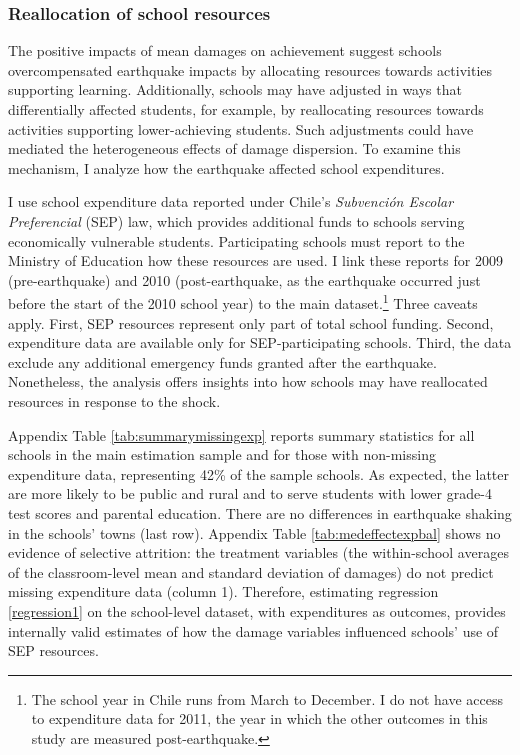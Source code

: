 \subsubsection{Reallocation of school resources}\label{sec:resources}

The positive impacts of mean damages on achievement suggest schools overcompensated earthquake impacts by allocating resources towards activities supporting learning. Additionally, schools may have adjusted in ways that differentially affected students, for example, by reallocating resources towards activities supporting lower-achieving students. Such adjustments could have mediated the heterogeneous effects of damage dispersion. To examine this mechanism, I analyze how the earthquake affected school expenditures. \par


I use school expenditure data reported under Chile’s {\itshape Subvenci\'{o}n Escolar Preferencial} (SEP) law, which provides additional funds to schools serving economically vulnerable students. Participating schools must report to the Ministry of Education how these resources are used. I link these reports for 2009 (pre-earthquake) and 2010 (post-earthquake, as the earthquake occurred just before the start of the 2010 school year) to the main dataset.\footnote{The school year in Chile runs from March to December. I do not have access to expenditure data for 2011, the year in which the other outcomes in this study are measured post-earthquake.} Three caveats apply. First, SEP resources represent only part of total school funding. Second, expenditure data are available only for SEP-participating schools. Third, the data exclude any additional emergency funds granted after the earthquake. Nonetheless, the analysis offers insights into how schools may have reallocated resources in response to the shock. \par

Appendix Table \ref{tab:summarymissingexp} reports summary statistics for all schools in the main estimation sample and for those with non-missing expenditure data, representing 42\% of the sample schools. As expected, the latter are more likely to be public and rural and to serve students with lower grade-4 test scores and parental education. There are no differences in earthquake shaking in the schools’ towns (last row). Appendix Table \ref{tab:medeffectexpbal} shows no evidence of selective attrition: the treatment variables (the within-school averages of the classroom-level mean and standard deviation of damages) do not predict missing expenditure data (column 1). Therefore, estimating regression \eqref{regression1} on the school-level dataset, with expenditures as outcomes, provides internally valid estimates of how the damage variables influenced schools' use of SEP resources.\par 



